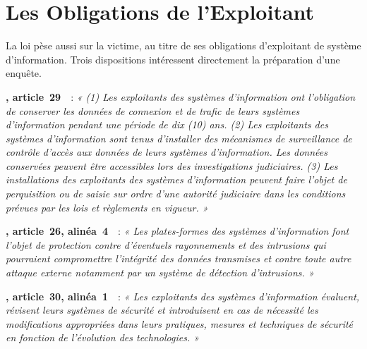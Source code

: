 \section{Les Obligations de l'Exploitant}
\label{sec:c08-obligations}

La loi pèse aussi sur la victime, au titre de ses obligations d'exploitant de
système d'information. Trois dispositions intéressent directement la
préparation d'une enquête.

\begin{boxjuris}
\textbf{, article~29}~\cite{loi2010012}~:
\textit{« (1) Les exploitants des systèmes d'information ont l'obligation
de conserver les données de connexion et de trafic de leurs systèmes
d'information pendant une période de dix (10) ans. (2) Les exploitants des
systèmes d'information sont tenus d'installer des mécanismes de
surveillance de contrôle d'accès aux données de leurs systèmes
d'information. Les données conservées peuvent être accessibles lors des
investigations judiciaires. (3) Les installations des exploitants des
systèmes d'information peuvent faire l'objet de perquisition ou de saisie
sur ordre d'une autorité judiciaire dans les conditions prévues par les lois
et règlements en vigueur. »}

\medskip
\textbf{, article~26, alinéa~4}~\cite{loi2010012}~:
\textit{« Les plates-formes des systèmes d'information font l'objet de
protection contre d'éventuels rayonnements et des intrusions qui pourraient
compromettre l'intégrité des données transmises et contre toute autre
attaque externe notamment par un système de détection d'intrusions. »}

\medskip
\textbf{, article~30, alinéa~1}~\cite{loi2010012}~:
\textit{« Les exploitants des systèmes d'information évaluent, révisent leurs
systèmes de sécurité et introduisent en cas de nécessité les modifications
appropriées dans leurs pratiques, mesures et techniques de sécurité en
fonction de l'évolution des technologies. »}
\end{boxjuris}

